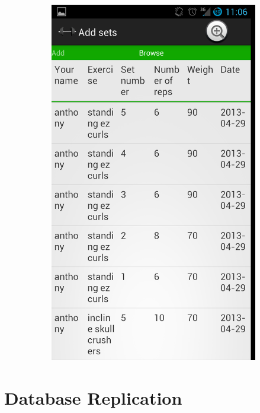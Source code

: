 \documentclass[]{beamer}
\begin{document}
\begin{frame}
\begin{figure}
\begin{subfigure}[b]{0.3\textwidth}
        \centering
        \includegraphics[width=\textwidth]{images/ss3.png}
    \end{subfigure}
\end{figure}

\end{frame}



\section{Database Replication}
\end{document}
